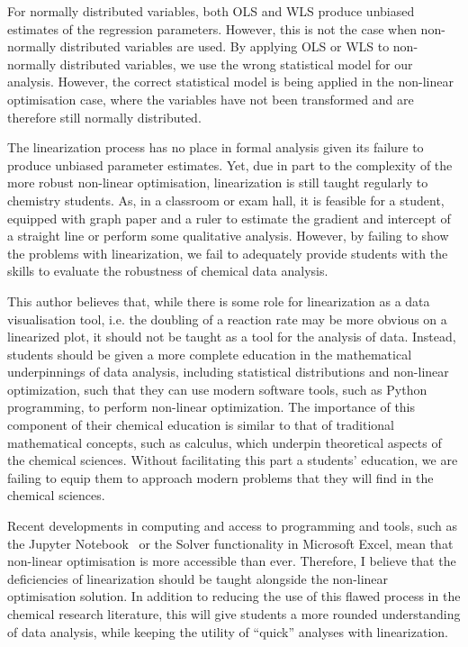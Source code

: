 \documentclass[journal=jceda8,manuscript=article]{achemso}
\begin{document}
For normally distributed variables, both OLS and WLS produce unbiased estimates of the regression parameters. 
However, this is not the case when non-normally distributed variables are used. 
By applying OLS or WLS to non-normally distributed variables, we use the wrong statistical model for our analysis. 
However, the correct statistical model is being applied in the non-linear optimisation case, where the variables have not been transformed and are therefore still normally distributed. 

The linearization process has no place in formal analysis given its failure to produce unbiased parameter estimates. 
Yet, due in part to the complexity of the more robust non-linear optimisation, linearization is still taught regularly to chemistry students. 
As, in a classroom or exam hall, it is feasible for a student, equipped with graph paper and a ruler to estimate the gradient and intercept of a straight line or perform some qualitative analysis.
However, by failing to show the problems with linearization, we fail to adequately provide students with the skills to evaluate the robustness of chemical data analysis. 

This author believes that, while there is some role for linearization as a data visualisation tool, i.e. the doubling of a reaction rate may be more obvious on a linearized plot, it should not be taught as a tool for the analysis of data. 
Instead, students should be given a more complete education in the mathematical underpinnings of data analysis, including statistical distributions and non-linear optimization, such that they can use modern software tools, such as Python programming, to perform non-linear optimization. 
The importance of this component of their chemical education is similar to that of traditional mathematical concepts, such as calculus, which underpin theoretical aspects of the chemical sciences.
Without facilitating this part a students' education, we are failing to equip them to approach modern problems that they will find in the chemical sciences. 

Recent developments in computing and access to programming and tools, such as the Jupyter Notebook~\cite{kluyver_jupyter_2016} or the Solver functionality in Microsoft Excel, mean that non-linear optimisation is more accessible than ever. 
Therefore, I believe that the deficiencies of linearization should be taught alongside the non-linear optimisation solution. 
In addition to reducing the use of this flawed process in the chemical research literature, this will give students a more rounded understanding of data analysis, while keeping the utility of ``quick'' analyses with linearization.
\end{document}
